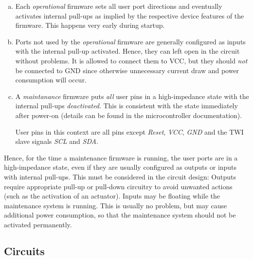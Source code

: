 \documentclass[12pt,english,parskip=half,headheight=19pt]{scrreprt}
\begin{document}
\begin{enumerate}[a)]

  \item
    Each \textit{operational} firmware sets all user port directions and eventually activates
    internal pull-ups as implied by the respective device features of the firmware.
    This happens very early during startup.

  \item
    Ports not used by the \textit{operational} firmware are generally configured as inputs with the
    internal pull-up activated. Hence, they can left open in the circuit without problems. It is
    allowed to connect them to VCC, but they should \textit{not} be connected to GND since otherwise
    unnecessary current draw and power consumption will occur.

  \item
    A \textit{maintanance} firmware puts \textit{all} user pins in a high-impedance state
    with the internal pull-ups \textit{deactivated}. This is consistent with the state immediately
    after power-on (details can be found in the microcontroller documentation).

    User pins in this context are all pins except \textit{Reset}, \textit{VCC}, \textit{GND} and the
    TWI slave signals \textit{SCL} and \textit{SDA}.

\end{enumerate}

Hence, for the time a maintenance firmware is running, the user ports are in a high-impedance state, even if they are usually configured as outputs or inputs with internal pull-ups. This must be considered in the circuit design: Outputs require appropriate pull-up or pull-down circuitry to avoid unwanted actions (such as the activation of an actuator). Inputs may be floating while the maintenance system is running. This is usually no problem, but may cause additional power consumption, so that the maintenance system should not be activated permanently.



\subsection{Circuits}
\end{document}
